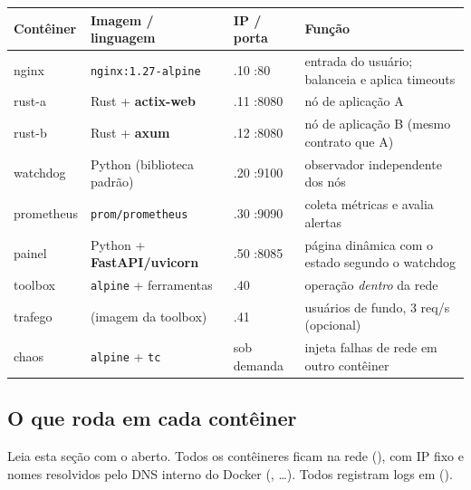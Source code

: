 \begin{center}
\small
\begin{tabularx}{\linewidth}{@{}>{\ttfamily}l>{\raggedright}p{3.9cm}>{\ttfamily}l>{\raggedright\arraybackslash}X@{}}
\toprule
\textbf{Contêiner} & \textbf{Imagem / linguagem} & \textbf{IP / porta} & \textbf{Função}\\ \midrule
nginx & \texttt{nginx:1.27-alpine} & .10 :80 & entrada do usuário; balanceia e aplica timeouts\\
rust-a & Rust + \textbf{actix-web} & .11 :8080 & nó de aplicação A\\
rust-b & Rust + \textbf{axum} & .12 :8080 & nó de aplicação B (mesmo contrato que A)\\
watchdog & Python (biblioteca padrão) & .20 :9100 & observador independente dos nós\\
prometheus & \texttt{prom/prometheus} & .30 :9090 & coleta métricas e avalia alertas\\
painel & Python + \textbf{FastAPI/uvicorn} & .50 :8085 & página dinâmica com o estado segundo o watchdog\\
toolbox & \texttt{alpine} + ferramentas & .40 & operação \emph{dentro} da rede\\
trafego & (imagem da toolbox) & .41 & usuários de fundo, 3 req/s (opcional)\\
chaos & \texttt{alpine} + \texttt{tc} & sob demanda & injeta falhas de rede em outro contêiner\\ \bottomrule
\end{tabularx}
\end{center}

\subsection{O que roda em cada contêiner}\label{sec:conteineres}

Leia esta seção com o  aberto. Todos os contêineres ficam na rede 
(), com IP fixo e nomes resolvidos pelo DNS interno do Docker (, \ldots).
Todos registram logs em  ().

\newenvironment{ficha}[1]{\par\medskip\noindent\textbf{#1}\par\nopagebreak
  \begin{center}\small\begin{tabular}{@{}>{\bfseries\raggedright}p{2.5cm}>{\raggedright\arraybackslash}p{\dimexpr\linewidth-2.5cm-2\tabcolsep\relax}@{}}\toprule}
  {\bottomrule\end{tabular}\end{center}\vspace{-6pt}}

